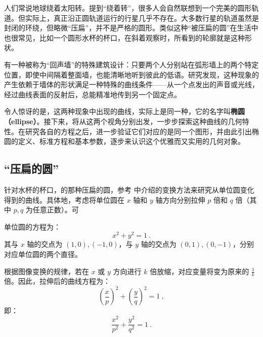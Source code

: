 
\begin{issues}
\issueDraft
\end{issues}


人们常说地球绕着太阳转。提到“绕着转”，很多人会自然联想到一个完美的圆形轨道。但实际上，真正沿正圆轨道运行的行星几乎不存在。大多数行星的轨道虽然是封闭的环绕，但略微“压扁”，并不是严格的圆形。类似这种“被压扁的圆”在生活中也很常见，比如一个圆形水杯的杯口，在斜着观察时，所看到的轮廓就是这种形状。

有一种被称为“回声墙”的特殊建筑设计：只要两个人分别站在弧形墙上的两个特定位置，即使中间隔着整面墙，也能清晰地听到彼此的低语。研究发现，这种现象的产生依赖于墙体的形状满足一种特殊的曲线条件——从一个点发出的声音或光线，经过曲线表面的反射后，总能精准地传到另一个固定点。

令人惊讶的是，这两种现象中出现的曲线，实际上是同一种，它的名字叫\textbf{椭圆（ellipse）}。接下来，将从这两个视角分别出发，一步步探索这种曲线的几何特性。在研究各自的方程之后，进一步验证它们对应的是同一个图形，并由此引出椭圆的定义、标准方程和基本参数，逐步来认识这个优雅而又实用的几何对象。

\subsection{“压扁的圆”}

针对水杯的杯口，的那种压扁的圆，参考 中介绍的变换方法来研究从单位圆变化得到的曲线。具体地，考虑将单位圆在 $x$ 轴和 $y$ 轴方向分别拉伸 $p$ 倍和 $q$ 倍（其中 $p, q$ 为任意正数）。可

单位圆的方程为：
\begin{equation}
x^2 + y^2 = 1~.
\end{equation}
其与 $x$ 轴的交点为 $(1, 0), (-1, 0)$，与 $y$ 轴的交点为 $(0, 1), (0, -1)$，分别对应单位圆的两个直径。

根据图像变换的规律，若在 $x$ 或 $y$ 方向进行 $k$ 倍放缩，对应变量将变为原来的 $\displaystyle\frac{1}{k}$ 倍。因此，拉伸后的曲线方程为：
\begin{equation}
\left(\frac{x}{p}\right)^2 + \left(\frac{y}{q}\right)^2 = 1~,
\end{equation}
即：
\begin{equation}\label{eq_Elips3_2}
\frac{x^2}{p^2} + \frac{y^2}{q^2} = 1~.
\end{equation}

